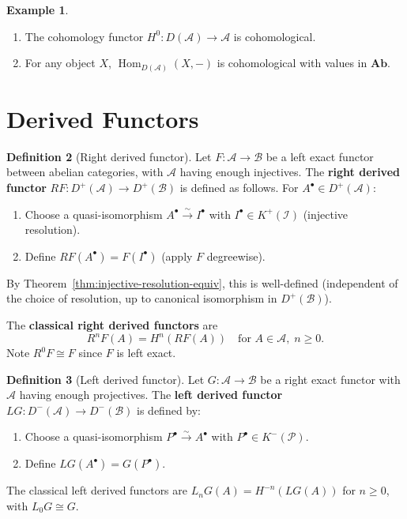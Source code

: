 \documentclass[a4paper,12pt]{book}
\DeclareMathOperator{\Hom}{Hom}
\newcommand{\Ab}{\mathbf{Ab}}
\theoremstyle{definition}
\newtheorem{definition}{Definition}[section]
\newtheorem{example}[definition]{Example}
\theoremstyle{plain}
\theoremstyle{remark}
\begin{document}
\begin{example}\label{ex:cohomological-functors}
\begin{enumerate}
    \item The cohomology functor $H^0 \colon D(\mathcal{A}) \to \mathcal{A}$ is cohomological.
    \item For any object $X$, $\Hom_{D(\mathcal{A})}(X, -)$ is cohomological with values
    in $\Ab$.
\end{enumerate}
\end{example}


\section{Derived Functors}\label{sec:derived-functors}

\begin{definition}[Right derived functor]\label{def:right-derived-functor}
Let $F \colon \mathcal{A} \to \mathcal{B}$ be a left exact functor between abelian
categories, with $\mathcal{A}$ having enough injectives. The \textbf{right derived functor}
$RF \colon D^+(\mathcal{A}) \to D^+(\mathcal{B})$ is defined as follows. For
$A^\bullet \in D^+(\mathcal{A})$:
\begin{enumerate}
    \item Choose a quasi-isomorphism $A^\bullet \xrightarrow{\sim} I^\bullet$ with
    $I^\bullet \in K^+(\mathcal{I})$ (injective resolution).
    \item Define $RF(A^\bullet) = F(I^\bullet)$ (apply $F$ degreewise).
\end{enumerate}
By Theorem~\ref{thm:injective-resolution-equiv}, this is well-defined (independent
of the choice of resolution, up to canonical isomorphism in $D^+(\mathcal{B})$).

The \textbf{classical right derived functors} are
\[
    R^n F(A) = H^n(RF(A)) \quad \text{for } A \in \mathcal{A}, \; n \geq 0.
\]
Note $R^0 F \cong F$ since $F$ is left exact.
\end{definition}

\begin{definition}[Left derived functor]\label{def:left-derived-functor}
Let $G \colon \mathcal{A} \to \mathcal{B}$ be a right exact functor with $\mathcal{A}$
having enough projectives. The \textbf{left derived functor}
$LG \colon D^-(\mathcal{A}) \to D^-(\mathcal{B})$ is defined by:
\begin{enumerate}
    \item Choose a quasi-isomorphism $P^\bullet \xrightarrow{\sim} A^\bullet$ with
    $P^\bullet \in K^-(\mathcal{P})$.
    \item Define $LG(A^\bullet) = G(P^\bullet)$.
\end{enumerate}
The classical left derived functors are $L_n G(A) = H^{-n}(LG(A))$ for $n \geq 0$,
with $L_0 G \cong G$.
\end{definition}
\end{document}
